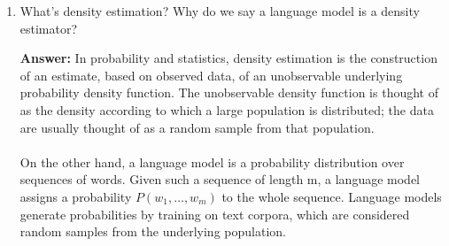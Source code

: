 \documentclass{article}
\newenvironment{QandA}{\begin{enumerate}[label=\arabic*.]}{\end{enumerate}}
\newenvironment{InnerQandA}{\begin{enumerate}[label=\roman*.]}{\end{enumerate}}
\newenvironment{answer}{\par\normalfont \textbf{Answer:}}{}
\begin{document}
\begin{QandA}
\begin{InnerQandA}
        \item How would you do dropouts in an RNN?
        \begin{answer}
            There are several possibilities for doing dropouts in RNNs:
            \begin{itemize}
                \item \textit{Dropout only to non-recurrent connections} -- thereby the network benefiting from regularization without sacrificing the memorization capabilities of the recurrent cells. 
                \item \textit{Variational Dropout} -- repeat the same dropout mask at each time step for both inputs, outputs and recurrent layers. 
                \item \textit{Recurrent Dropout} -- Apply dropout to the hidden state update vector, instead of the entire hidden state. 
                \item \textit{Zoneout} -- instead of setting some units’ activations to 0 as in dropout, zoneout randomly replaces some units’ activations with their activations from the previous timestep. This makes it easier for the network to preserve information from previous timesteps going forward, and facilitates, rather than hinders, the flow of gradient information going backward.
            \end{itemize}

            (See more \href{https://adriangcoder.medium.com/a-review-of-dropout-as-applied-to-rnns-72e79ecd5b7b}{here})
        \end{answer}

    \end{InnerQandA}
    \item What’s density estimation? Why do we say a language model is a density estimator?
        \begin{answer}
            In probability and statistics, density estimation is the construction of an estimate, based on observed data, of an unobservable underlying probability density function. The unobservable density function is thought of as the density according to which a large population is distributed; the data are usually thought of as a random sample from that population. \\\\
            On the other hand, a language model is a probability distribution over sequences of words. Given such a sequence of length m, a language model assigns a probability $P(w_1, \ldots, w_m)$ to the whole sequence. Language models generate probabilities by training on text corpora, which are considered random samples from the underlying population.


\end{answer}
\end{QandA}
\end{document}
